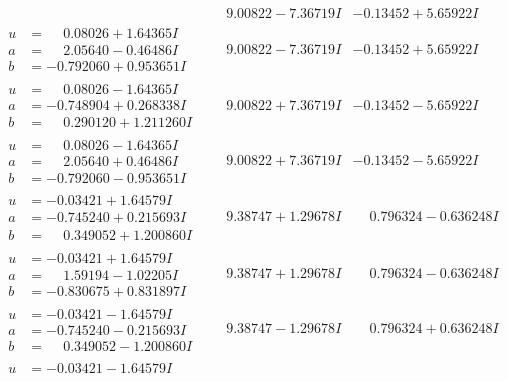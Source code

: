 \documentclass[1p]{elsarticle_modified}
\theoremstyle{definition}
\begin{document}
$$\begin{array}{c|c|c}
 & \phantom{-}9.00822 - 7.36719 I & -0.13452 + 5.65922 I \\ \hline\begin{aligned}
u &= \phantom{-}0.08026 + 1.64365 I \\
a &= \phantom{-}2.05640 - 0.46486 I \\
b &= -0.792060 + 0.953651 I\end{aligned}
 & \phantom{-}9.00822 - 7.36719 I & -0.13452 + 5.65922 I \\ \hline\begin{aligned}
u &= \phantom{-}0.08026 - 1.64365 I \\
a &= -0.748904 + 0.268338 I \\
b &= \phantom{-}0.290120 + 1.211260 I\end{aligned}
 & \phantom{-}9.00822 + 7.36719 I & -0.13452 - 5.65922 I \\ \hline\begin{aligned}
u &= \phantom{-}0.08026 - 1.64365 I \\
a &= \phantom{-}2.05640 + 0.46486 I \\
b &= -0.792060 - 0.953651 I\end{aligned}
 & \phantom{-}9.00822 + 7.36719 I & -0.13452 - 5.65922 I \\ \hline\begin{aligned}
u &= -0.03421 + 1.64579 I \\
a &= -0.745240 + 0.215693 I \\
b &= \phantom{-}0.349052 + 1.200860 I\end{aligned}
 & \phantom{-}9.38747 + 1.29678 I & \phantom{-}0.796324 - 0.636248 I \\ \hline\begin{aligned}
u &= -0.03421 + 1.64579 I \\
a &= \phantom{-}1.59194 - 1.02205 I \\
b &= -0.830675 + 0.831897 I\end{aligned}
 & \phantom{-}9.38747 + 1.29678 I & \phantom{-}0.796324 - 0.636248 I \\ \hline\begin{aligned}
u &= -0.03421 - 1.64579 I \\
a &= -0.745240 - 0.215693 I \\
b &= \phantom{-}0.349052 - 1.200860 I\end{aligned}
 & \phantom{-}9.38747 - 1.29678 I & \phantom{-}0.796324 + 0.636248 I \\ \hline\begin{aligned}
u &= -0.03421 - 1.64579 I \\

\end{aligned}
\end{array}$$
\end{document}

